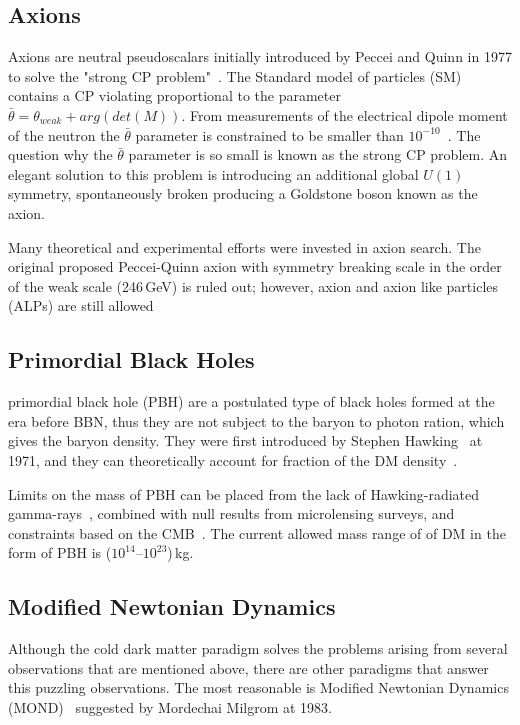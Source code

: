 \subsection{Axions}

Axions are neutral pseudoscalars initially introduced by Peccei and Quinn in 1977 to solve the "strong CP problem"~\cite{Peccei:1977hh}. The Standard model of particles (SM) contains a CP violating proportional to the parameter $\bar{\theta} = \theta_{weak}+ arg(det(M))$. From measurements  of the electrical dipole moment of the neutron the $\bar{\theta}$ parameter is constrained to be smaller than $10^{-10}$~\cite{Pospelov:2005pr,Baker:2006ts}. The question why the $\bar{\theta}$ parameter is so small is known as the strong CP problem. An elegant solution to this problem is introducing an additional global $U(1)$ symmetry, spontaneously broken producing a Goldstone boson known as the axion. 

Many theoretical and experimental efforts were invested in axion search. The original proposed Peccei-Quinn axion with symmetry breaking scale in the order of the weak scale (246\,GeV) is ruled out; however, axion and axion like particles (ALPs) are still allowed~\cite{Kim:1979if,Akerib:2017uem} 

\subsection{Primordial Black Holes}
primordial black hole (PBH) are a postulated type of black holes formed at the era before BBN, thus they are not subject to the baryon to photon ration, which gives the baryon density. They were first introduced by Stephen Hawking~\cite{PBH} at 1971, and they can theoretically account for fraction of the DM density~\cite{Carr:2016drx}. 

Limits on the mass of PBH can be placed from the lack
of Hawking-radiated gamma-rays~\cite{MacGibbon:1987my}, combined with null results from microlensing surveys, and constraints based on the CMB~\cite{Ricotti:2007au}. The current allowed mass range of of DM in the form of PBH is ($10^{14}$--$10^{23}$)\,kg.

\subsection{Modified Newtonian Dynamics}
\label{subsec:MOND}

Although the cold dark matter paradigm solves the problems arising from several observations that are mentioned above, there are other paradigms that answer this puzzling observations. The most reasonable is Modified Newtonian Dynamics (MOND)~\cite{Milgrom:1983ca} suggested by Mordechai Milgrom at 1983.

